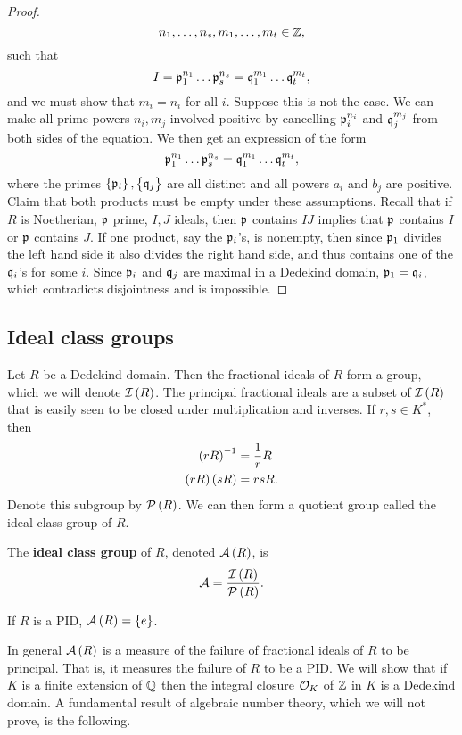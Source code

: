 \begin{proof}
$$ n_1, \dots, n_s, m_1, \dots, m_t \in \mathbb{Z}, $$
such that
$$ I = \mathfrak{p}_1^{n_1} \dots \mathfrak{p}_s^{n_s} = \mathfrak{q}_1^{m_1} \dots \mathfrak{q}_t^{m_t}, $$
and we must show that $ m_i = n_i $ for all $ i $. Suppose this is not the case. We can make all prime powers $ n_i, m_j $ involved positive by cancelling $ \mathfrak{p}_i^{n_i} $ and $ \mathfrak{q}_j^{m_j} $ from both sides of the equation. We then get an expression of the form
$$ \mathfrak{p}_1^{n_1} \dots \mathfrak{p}_s^{n_s} = \mathfrak{q}_1^{m_1} \dots \mathfrak{q}_t^{m_t}, $$
where the primes $ \cbr{\pp_i}, \cbr{\qq_j} $ are all distinct and all powers $ a_i $ and $ b_j $ are positive. Claim that both products must be empty under these assumptions. Recall that if $ R $ is Noetherian, $ \mathfrak{p} $ prime, $ I, J $ ideals, then $ \mathfrak{p} $ contains $ IJ $ implies that $ \mathfrak{p} $ contains $ I $ or $ \mathfrak{p} $ contains $ J $. If one product, say the $ \mathfrak{p}_i $'s, is nonempty, then since $ \mathfrak{p}_1 $ divides the left hand side it also divides the right hand side, and thus contains one of the $ \mathfrak{q}_i $'s for some $ i $. Since $ \mathfrak{p}_i $ and $ \mathfrak{q}_j $ are maximal in a Dedekind domain, $ \mathfrak{p}_1 = \mathfrak{q}_i $, which contradicts disjointness and is impossible.
\end{proof}

\pagebreak

\subsection{Ideal class groups}

Let $ R $ be a Dedekind domain. Then the fractional ideals of $ R $ form a group, which we will denote $ \II\br{R} $. The principal fractional ideals are a subset of $ \II\br{R} $ that is easily seen to be closed under multiplication and inverses. If $ r, s \in K^* $, then
\begin{align*}
\br{rR}^{-1} & = \dfrac{1}{r}R \\
\br{rR}\br{sR} & = rsR.
\end{align*}
Denote this subgroup by $ \PP\br{R} $. We can then form a quotient group called the ideal class group of $ R $.

\begin{definition}
The \textbf{ideal class group} of $ R $, denoted $ \AA\br{R} $, is
$$ \AA = \dfrac{\II\br{R}}{\PP\br{R}}. $$
\end{definition}

\begin{example*}
If $ R $ is a PID, $ \AA\br{R} = \cbr{e} $.
\end{example*}

In general $ \AA\br{R} $ is a measure of the failure of fractional ideals of $ R $ to be principal. That is, it measures the failure of $ R $ to be a PID. We will show that if $ K $ is a finite extension of $ \mathbb{Q} $ then the integral closure $ \mathcal{O}_K $ of $ \mathbb{Z} $ in $ K $ is a Dedekind domain. A fundamental result of algebraic number theory, which we will not prove, is the following.


